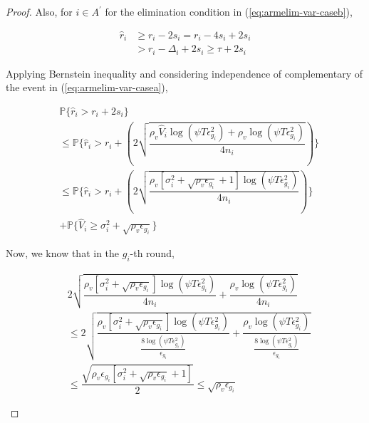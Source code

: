 \begin{proof}
Also, for ${i} \in A^{'}$ for the elimination condition in (\ref{eq:armelim-var-caseb}), 
\begin{small}
\begin{align*}
\hat{r}_{i}&\geq r_{i} - 2s_{i} = r_{i} - 4s_{i} + 2s_{i} \\
&> r_{i} - \Delta_{i} + 2s_{i}\geq \tau + 2s_{i} %
\end{align*}
\end{small}


Applying Bernstein inequality and considering independence of complementary of the event in (\ref{eq:armelim-var-casea}),
\begin{small}
\begin{align}
&\mathbb{P}\lbrace\hat{r}_{i}> r_{i} + 2s_{i}\rbrace\\
&\leq \mathbb{P}\bigg\lbrace \hat{r}_{i} > r_{i}+ ( 2\sqrt{\dfrac{\rho_v \hat{V}_{i}\log(\psi T\epsilon_{g_{i}}^{2}) + \rho_v \log{(\psi T\epsilon_{g_{i}}^{2})}}{4n_{i}} }) \bigg\rbrace\\
&\leq \mathbb{P}\bigg\lbrace \hat{r}_{i} > r_{i}+ (2\sqrt{\dfrac{\rho_v [\sigma_{i}^{2}+\sqrt{\rho_{v}\epsilon_{g_{i}}} + 1]\log(\psi T\epsilon_{g_{i}}^{2})}{4n_{i}}})\bigg\rbrace \label{eq:prob_eq1}\\ 
&+ \mathbb{P}\bigg\lbrace \hat{V}_{i}\geq \sigma_{i}^{2}+\sqrt{\rho_{v}\epsilon_{g_{i}}}\bigg\rbrace \label{eq:prob_eq2}
\end{align}
\end{small}
 
 
Now, we know that in the $g_{i}$-th round,
\begin{small}
\begin{align*}
& 2\sqrt{\dfrac{\rho_v [\sigma_{i}^{2}+\sqrt{\rho_{v}\epsilon_{g_{i}}}]\log(\psi T\epsilon_{g_{i}}^{2})}{4n_{i}} + \dfrac{\rho_v \log{(\psi T\epsilon_{g_{i}}^{2})}}{4 n_{i}}}\\ &\leq  2\sqrt{\dfrac{\rho_v [\sigma_{i}^{2}+\sqrt{\rho_{v}\epsilon_{g_{i}}}]\log(\psi T\epsilon_{g_{i}}^{2})}{\frac{8\log(\psi T \epsilon_{g_{i}}^{2})}{\epsilon_{g_{i}}}} + \dfrac{\rho_v \log{(\psi T\epsilon_{g_{i}}^{2})}}{\frac{8\log(\psi T \epsilon_{g_{i}}^{2})}{\epsilon_{g_{i}}}}}\\
& \leq \dfrac{\sqrt{\rho_v \epsilon_{g_{i}}[\sigma_{i}^{2}+\sqrt{\rho_{v}\epsilon_{g_{i}}} + 1]}}{2}\leq \sqrt{\rho_v \epsilon_{g_{i}}}
\end{align*}
\end{small}



\end{proof}
